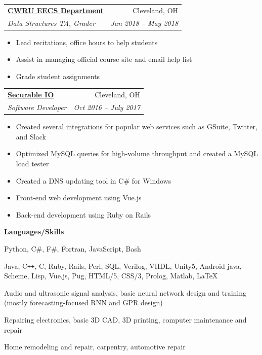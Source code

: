 \documentclass[letterpaper,11pt]{article}
\makeatletter
\newcommand{\resitem}[1]{\item #1}
\newcommand{\resheading}[1]{
	{\large \colorbox{sectionheaderbg}{
		\begin{minipage}{\textwidth}{
			\textcolor{sectionheaderfg}{\textbf{#1 \vphantom{p\^{E}}}}
		}
		\end{minipage}
	}}}
\newcommand{\ressubheading}[4]{
\begin{tabular*}{\textwidth}{l@{\extracolsep{\fill}}r}
		\textcolor{companytextfg}{\ul{\textbf{#1}}} & #2 \\
		\textit{#3} & \textit{#4} \\
\end{tabular*}\vspace{-6pt}}
\makeatother
\begin{document}
\begin{minipage}{\linewidth}
\begin{minipage}[t]{0.7\linewidth}
	\ressubheading{CWRU EECS Department}{Cleveland, OH}{Data Structures TA, Grader}{Jan 2018 -- May 2018}
	\begin{itemize}[leftmargin=*,noitemsep]
		\resitem{Lead recitations, office hours to help students}
		\resitem{Assist in managing official course site and email help list}
		\resitem{Grade student assignments}
	\end{itemize}
	
	\ressubheading{Securable IO}{Cleveland, OH}{Software Developer}{Oct 2016 -- July 2017}
	\begin{itemize}[leftmargin=*,noitemsep]
		\resitem{Created several integrations for popular web services such as GSuite, Twitter, and Slack}
		\resitem{Optimized MySQL queries for high-volume throughput and created a MySQL load tester}
		\resitem{Created a DNS updating tool in C\# for Windows}
		\resitem{Front-end web development using Vue.js}
		\resitem{Back-end development using Ruby on Rails}
	\end{itemize}
\end{minipage}
\hfill
\begin{minipage}[t]{0.27\linewidth}

	\begin{minipage}[t]{\linewidth}
		\resheading{Languages/Skills}
		
		\begin{description}[noitemsep]
			\item[Strong:]
			Python, C\#, F\#, Fortran, JavaScript, Bash
			\item[Weak:]
			Java, C{}\verb!++!, C, Ruby, Rails, Perl, SQL, Verilog, VHDL, Unity5, Android java, Scheme, Lisp, Vue.js, Pug, HTML/5, CSS/3, Prolog, Matlab, LaTeX
			
			\vspace{0.1in}
			\item[Specialized software skills:]
			Audio and ultrasonic signal analysis,
			basic neural network design and training (mostly forecasting-focused RNN and GPR design)
			\item[Misc electronics skills:]
			Repairing electronics,
			basic 3D CAD, 3D printing,
			computer maintenance and repair
			\item[Misc Skills:]
			Home remodeling and repair, carpentry,
			automotive repair
		\end{description}
	\end{minipage}
\end{minipage}
\end{minipage}
\end{document}
